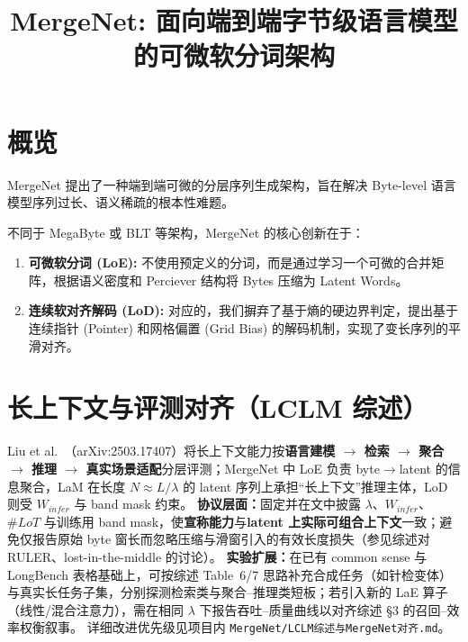 \documentclass[a4paper,11pt]{article}
\title{\textbf{MergeNet: 面向端到端字节级语言模型的可微软分词架构}}
\author{}
\date{}
\begin{document}
\maketitle

\section{概览}

MergeNet 提出了一种端到端可微的分层序列生成架构，旨在解决 Byte-level 语言模型序列过长、语义稀疏的根本性难题。

不同于 MegaByte 或 BLT 等架构，MergeNet 的核心创新在于：

\begin{enumerate}
    \item \textbf{可微软分词 (LoE):} 不使用预定义的分词，而是通过学习一个可微的合并矩阵，根据语义密度和 Perciever 结构将 Bytes 压缩为 Latent Words。
    \item \textbf{连续软对齐解码 (LoD):} 对应的，我们摒弃了基于熵的硬边界判定，提出基于连续指针 (Pointer) 和网格偏置 (Grid Bias) 的解码机制，实现了变长序列的平滑对齐。
\end{enumerate}

\section{长上下文与评测对齐（LCLM 综述）}

Liu et al.\ （arXiv:2503.17407）将长上下文能力按\textbf{语言建模 $\rightarrow$ 检索 $\rightarrow$ 聚合 $\rightarrow$ 推理 $\rightarrow$ 真实场景适配}分层评测；MergeNet 中 LoE 负责 byte$\rightarrow$latent 的信息聚合，LaM 在长度 $N\approx L/\lambda$ 的 latent 序列上承担``长上下文''推理主体，LoD 则受 $W_{infer}$ 与 band mask 约束。
\textbf{协议层面：}固定并在文中披露 $\lambda$、$W_{infer}$、$\#LoT$ 与训练用 band mask，使\textbf{宣称能力}与\textbf{latent 上实际可组合上下文}一致；避免仅报告原始 byte 窗长而忽略压缩与滑窗引入的有效长度损失（参见综述对 RULER、lost-in-the-middle 的讨论）。
\textbf{实验扩展：}在已有 common sense 与 LongBench 表格基础上，可按综述 Table~6/7 思路补充合成任务（如针检变体）与真实长任务子集，分别探测检索类与聚合--推理类短板；若引入新的 LaE 算子（线性/混合注意力），需在相同 $\lambda$ 下报告吞吐--质量曲线以对齐综述 \S3 的召回--效率权衡叙事。
详细改进优先级见项目内 \texttt{MergeNet/LCLM综述与MergeNet对齐.md}。
\end{document}
